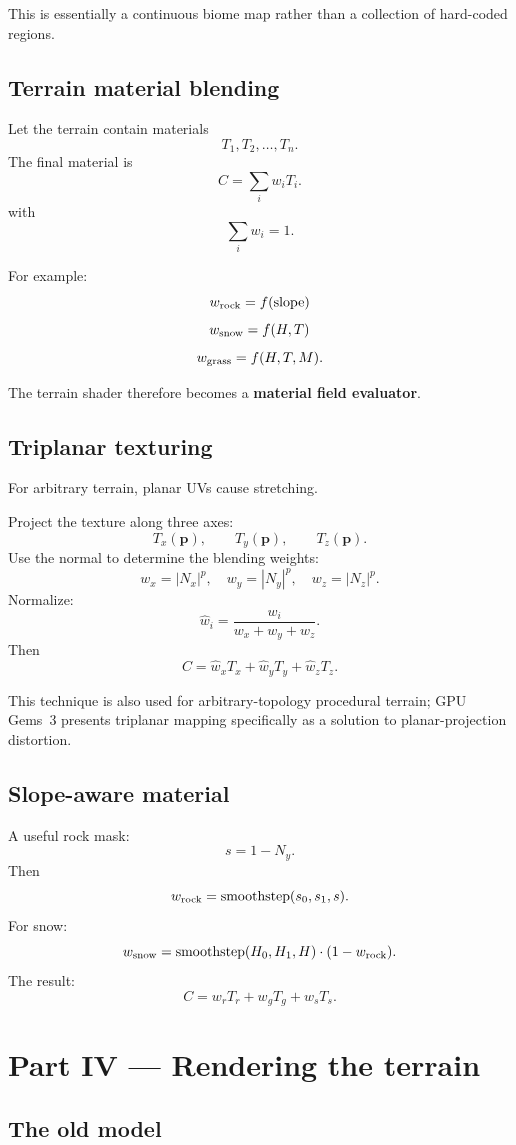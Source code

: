 \documentclass[12pt]{article}
\begin{document}
	This is essentially a continuous biome map rather than a collection of hard-coded regions.
	
	\subsection{Terrain material blending}
	
	Let the terrain contain materials
	\[
	T_1,T_2,\ldots,T_n.
	\]
	The final material is
	\[
	\boxed{
		C= \sum_i w_i T_i.
	}
	\]
	with
	\[
	\sum_i w_i=1.
	\]
	
	For example:
	\[
	w_{\rm rock}= f(\text{slope})
	\]
	\[
	w_{\rm snow}= f(H,T)
	\]
	\[
	w_{\rm grass}= f(H,T,M).
	\]
	
	The terrain shader therefore becomes a \textbf{material field evaluator}.
	
	\subsection{Triplanar texturing}
	
	For arbitrary terrain, planar UVs cause stretching.
	
	Project the texture along three axes:
	\[
	T_x(\mathbf p),\qquad T_y(\mathbf p),\qquad T_z(\mathbf p).
	\]
	Use the normal to determine the blending weights:
	\[
	w_x=|N_x|^p,\quad
	w_y=|N_y|^p,\quad
	w_z=|N_z|^p.
	\]
	Normalize:
	\[
	\boxed{
		\hat w_i=
		\frac{w_i}{w_x+w_y+w_z}.
	}
	\]
	Then
	\[
	\boxed{
		C=
		\hat w_x T_x+
		\hat w_y T_y+
		\hat w_z T_z.
	}
	\]
	
	This technique is also used for arbitrary-topology procedural terrain; GPU Gems~3 presents triplanar mapping specifically as a solution to planar-projection distortion.
	
	\subsection{Slope-aware material}
	
	A useful rock mask:
	\[
	s=1-N_y.
	\]
	Then
	\[
	w_{\rm rock}= \operatorname{smoothstep}(s_0,s_1,s).
	\]
	For snow:
	\[
	w_{\rm snow}= \operatorname{smoothstep}(H_0,H_1,H) \cdot (1-w_{\rm rock}).
	\]
	The result:
	\[
	\boxed{
		C= w_r T_r+ w_g T_g+ w_s T_s.
	}
	\]
	
	\section*{Part IV — Rendering the terrain}
	
	\subsection{The old model}
	
\end{document}

